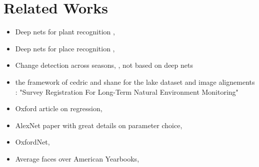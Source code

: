 \section{Related Works}

\begin{itemize}
    \item Deep nets for plant recognition \cite{Reyes2015},
    \item Deep nets for place recognition \cite{Sunderhauf2015},
    \item Change detection across seasons, \cite{Neubert2013}, not based on deep nets
    \item the framework of cedric and shane for the lake dataset and image alignements : "Survey Registration For Long-Term Natural Environment Monitoring"
    \item Oxford article on regression, \cite{conf/accv/PfisterSCZ14}
    \item AlexNet paper with great details on parameter choice, \cite{NIPS2012_4824}
    \item OxfordNet, \cite{Simonyan14c}
    \item Average faces over American Yearbooks, \cite{ginosar2015century}
\end{itemize}

